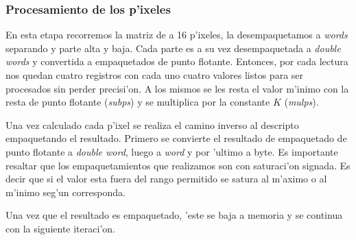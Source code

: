 \subsubsection*{Procesamiento de los p'ixeles}

En esta etapa recorremos la matriz de a 16 p'ixeles, la desempaquetamos a \textit{words} separando y parte alta y baja. Cada parte es a su vez desempaquetada a  \textit{double words} y convertida a empaquetados de punto flotante. Entonces, por cada lectura nos quedan cuatro registros con cada uno cuatro valores listos para ser procesados sin perder precisi'on. A los mismos se les resta el valor m'inimo con la resta de punto flotante (\textit{subps}) y se multiplica por la constante $K$ (\textit{mulps}).

Una vez calculado cada p'ixel se realiza el camino inverso al descripto empaquetando el resultado. Primero se convierte el resultado de empaquetado de punto flotante a \textit{double word}, luego a \textit{word} y por 'ultimo a byte. Es importante resaltar que los empaquetamientos que realizamos son con saturaci'on signada. Es decir que si el valor esta fuera del rango permitido se satura al m'aximo o al m'inimo seg'un corresponda. 

Una vez que el resultado es empaquetado, 'este se baja a memoria y se continua con la siguiente iteraci'on.


